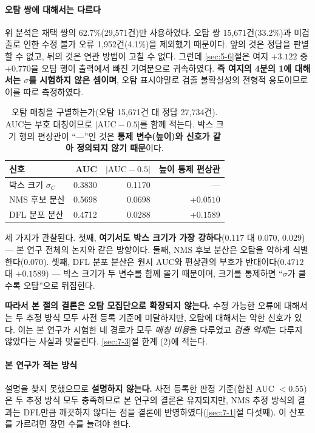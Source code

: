 \documentclass[12pt,a4paper,oneside]{report}
\begin{document}
\paragraph{오탐 쌍에 대해서는 다르다} 위 분석은 채택 쌍의 62.7\%(29{,}571건)만 사용하였다. 오탐 쌍 15{,}671건(33.2\%)과 미검출로 인한 수정 불가 오류 1{,}952건(4.1\%)을 제외했기 때문이다. 앞의 것은 정답을 판별할 수 없고, 뒤의 것은 연관 방법이 고칠 수 없다. 그런데 \ref{sec:5-6}절은 여지 $+3.122$ 중 $+0.770$을 오탐 행이 출력에서 빠진 기여분으로 귀속하였다. \textbf{즉 여지의 4분의 1에 대해서는 $\sigma$를 시험하지 않은 셈이며}, 오탐 표시야말로 검출 불확실성의 전형적 용도이므로 이를 따로 측정하였다.

\begin{table}[htbp]
\centering
\small
\caption{오탐 매칭을 구별하는가(오탐 15{,}671건 대 정답 27{,}734건). AUC는 부호 대칭이므로 $|\mathrm{AUC}-0.5|$를 함께 적는다. 박스 크기 행의 편상관이 ``---''인 것은 \textbf{통제 변수(높이)와 신호가 같아 정의되지 않기 때문}이다.}
\label{tab:fp}
\begin{tabular}{lrrr}
\toprule
신호 & AUC & $|\mathrm{AUC}-0.5|$ & 높이 통제 편상관 \\
\midrule
박스 크기 $\sigma_C$ & 0.3830 & 0.1170 & --- \\
NMS 후보 분산 & 0.5698 & 0.0698 & $+0.0510$ \\
DFL 분포 분산 & 0.4712 & 0.0288 & $+0.1589$ \\
\bottomrule
\end{tabular}
\end{table}

세 가지가 관찰된다. 첫째, \textbf{여기서도 박스 크기가 가장 강하다}($0.117$ 대 $0.070$, $0.029$) --- 본 연구 전체의 논지와 같은 방향이다. 둘째, NMS 후보 분산은 오탐을 약하게 식별한다($0.070$). 셋째, DFL 분포 분산은 원시 AUC와 편상관의 부호가 반대이다($0.4712$ 대 $+0.1589$) --- 박스 크기가 두 변수를 함께 몰기 때문이며, 크기를 통제하면 ``$\sigma$가 클수록 오탐''으로 뒤집힌다.

\textbf{따라서 본 절의 결론은 오탐 모집단으로 확장되지 않는다.} 수정 가능한 오류에 대해서는 두 추정 방식 모두 사전 등록 기준에 미달하지만, 오탐에 대해서는 약한 신호가 있다. 이는 본 연구가 시험한 네 경로가 모두 \textit{매칭 비용}을 다루었고 \textit{검출 억제}는 다루지 않았다는 사실과 맞물린다. \ref{sec:7-3}절 한계 (2)에 적는다.

\paragraph{본 연구가 적는 방식} 설명을 찾지 못했으므로 \textbf{설명하지 않는다.} 사전 등록한 판정 기준(합친 AUC $< 0.55$)은 두 추정 방식 모두 충족하므로 본 연구의 결론은 유지되지만, NMS 추정 방식의 결과는 DFL만큼 깨끗하지 않다는 점을 결론에 반영하였다(\ref{sec:7-1}절 다섯째). 이 산포를 가르려면 장면 수를 늘려야 한다.
\end{document}
